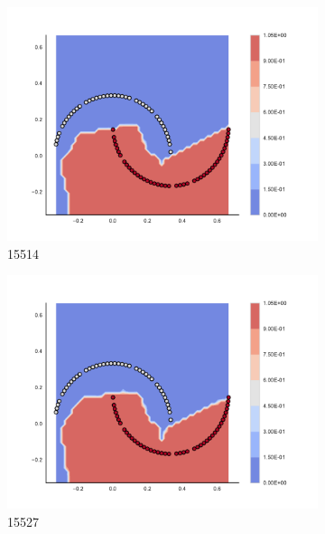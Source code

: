 \begin{figure}[h]
\begin{subfigure}[b]{0.09\textwidth}
    \includegraphics[clip, trim=2.35cm 1.75cm 4.5cm 0cm,width=\textwidth]{img/convergence/15514.pdf}
    \caption{15514}
    \label{fig:convergence_15514}
\end{subfigure}
%
\begin{subfigure}[b]{0.09\textwidth}
    \includegraphics[clip, trim=2.35cm 1.75cm 4.5cm 0cm,width=\textwidth]{img/convergence/15527.pdf}
    \caption{15527}
    \label{fig:convergence_15527}
\end{subfigure}
%
\begin{subfigure}[b]{0.09\textwidth}

\end{subfigure}
\end{figure}
